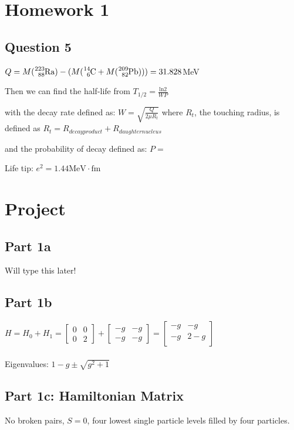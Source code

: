 \documentclass[12pt]{article}
\begin{document}
\section{Homework 1}

\subsection{Question 5}
$Q=M(\ce{^{223}_{88}Ra})-(M(\ce{^{14}_{6}C}+M(\ce{^{209}_{82}Pb})))=31.828$MeV

Then we can find the half-life from $T_{1/2}=\frac{\text{ln}2}{W P}$

with the decay rate defined as: 
 $W=\sqrt{\frac{Q}{2\mu R_t}}$ where $R_t$, the touching radius, is defined as $R_t=R_{decay product}+R_{daughter nucleus}$
 
 and the probability of decay defined as: 
 $P=$

Life tip: $e^2=1.44  \text{MeV}\cdot\text{fm}$


\newpage

\section{Project}
    
    \subsection{Part 1a}

Will type this later!

\subsection{Part 1b}
$H=H_0+H_1=
\begin{bmatrix}
	0 & 0\\
	0 & 2
	\end{bmatrix}
+
\begin{bmatrix}
	-g & -g \\
	-g & -g
	\end{bmatrix}
	=
\begin{bmatrix}
	-g & -g\\
	-g & 2-g\\
	\end{bmatrix}
	$
	\\
	\\
	Eigenvalues: 
	$1-g \pm \sqrt{g^2+1}$
	
	
\subsection{Part 1c: Hamiltonian Matrix}
No broken pairs, $S=0$, four lowest single particle levels filled by four particles. 
\end{document}
